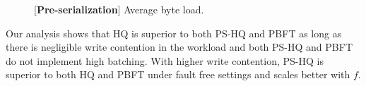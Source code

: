 \documentclass[twocolumn,10pt]{article}
\newcommand{\stitle}[1]{\vspace{2pt}{\bf #1:}}
\begin{document}
\begin{figure}[t]
\centering
\begin{minipage}[t]{0.47\textwidth}
\caption{\label{fig:abs_mesg_count_comp} [\textbf{Pre-serialization}] Average message load.
$C$ represents contention in the workload.}
\end{minipage}
\begin{minipage}[t]{0.47\textwidth}
\caption{\label{fig:byte_count_comp} [\textbf{Pre-serialization}] Average byte load.}
\end{minipage}
\end{figure}
\fi

\stitle{Summary} Our analysis shows that HQ is superior to both PS-HQ and PBFT as long as there is
negligible write contention in the workload and both PS-HQ and PBFT do not implement high
batching. With higher write contention, PS-HQ is superior to both HQ and PBFT under fault free
settings and scales better with $f$.
\end{document}
